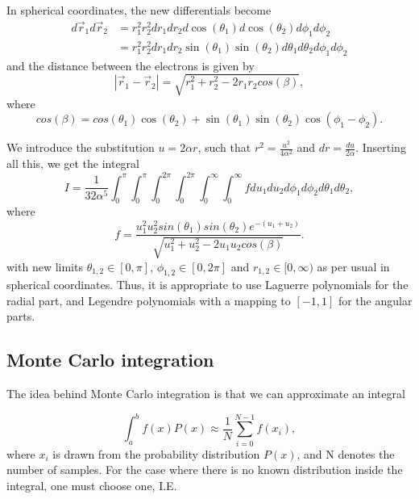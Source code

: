 \documentclass{emulateapj}
\begin{document}
In spherical coordinates, the new differentials become
\begin{align*}
    d\vec{r}_1d\vec{r}_2 &= r_1^2r_2^2 dr_1dr_2 d\cos(\theta_1)d\cos(\theta_2) d\phi_1d\phi_2 \\
    &= r_1^2r_2^2 dr_1dr_2\sin(\theta_1)\sin(\theta_2)d\theta_1d\theta_2d\phi_1d\phi_2
\end{align*}
and the distance between the electrons is given by
\begin{equation*}
|\vec{r}_1 - \vec{r}_2| = \sqrt{r_1^2 + r_2^2 - 2r_1r_2cos(\beta)},
\end{equation*}
where
\begin{equation*}
cos(\beta) = cos(\theta_1)\cos(\theta_2) + \sin(\theta_1)\sin(\theta_2)\cos(\phi_1 - \phi_2).
\end{equation*}

We introduce the substitution $u = 2\alpha r$, such that $r^2 = \frac{u^2}{4\alpha^2}$ and $dr = \frac{du}{2\alpha}$. Inserting all this, we get the integral
\begin{equation}
    I = \frac{1}{32\alpha^5}\int_0^\pi \int_0^\pi \int_0^{2\pi} \int_0^{2\pi} \int_0^{\infty} \int_0^{\infty} f du_1 du_2 d\phi_1 d\phi_2 d\theta_1 d\theta_2,
\end{equation}
where
\begin{equation}
    f = \frac{u_1^2 u_2^2 sin\left(\theta_1\right) sin\left(\theta_2\right) e^{-\left(u_1+u_2\right)}}{\sqrt{u_1^2 + u_2^2 - 2u_1u_2cos\left(\beta\right)}}.
\end{equation}
with new limits $\theta_{1,2} \in [0,\pi]$, $\phi_{1,2} \in [0,2\pi]$ and $r_{1,2} \in [0,\infty)$ as per usual in spherical coordinates. Thus, it is appropriate to use Laguerre polynomials for the radial part, and Legendre polynomials with a mapping to $[-1,1]$ for the angular parts.

\subsection{Monte Carlo integration}
The idea behind Monte Carlo integration is that we can approximate an integral

\begin{equation} \label{eq:MC}
    \int_a^b f\left(x\right) P\left(x\right) \approx \frac{1}{N}\sum_{i=0}^{N-1} f\left(x_i\right),
\end{equation}
where $x_i$ is drawn from the probability distribution $P\left(x\right)$, and N denotes the number of samples. For the case where there is no known distribution inside the integral, one must choose one, I.E.
\end{document}
